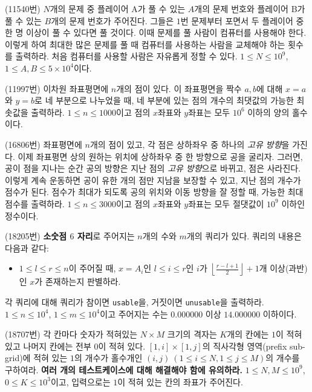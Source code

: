 \begin{problem}
    (11540번) $N$개의 문제 중 플레이어 A가 풀 수 있는 $A$개의 문제 번호와 플레이어 B가 풀 수 있는 $B$개의 문제 번호가 주어진다. 그들은 $1$번 문제부터 포면서 두 플레이어 중 한 명 이상이 풀 수 있다면 풀 것이다. 이때 문제를 풀 사람이 컴퓨터를 사용해야 한다. 이렇게 하여 최대한 많은 문제를 풀 때 컴퓨터를 사용하는 사람을 교체해야 하는 횟수를 출력하라. 처음 컴퓨터를 사용할 사람은 자유롭게 정할 수 있다. $1 \leq N \leq 10^9$, $1 \leq A, B \leq 5 \times 10^4$이다.
\end{problem}

\begin{problem}
    (11997번) 이차원 좌표평면에 $n$개의 점이 있다. 이 좌표평면을 짝수 $a, b$에 대해 $x=a$와 $y=b$로 네 부분으로 나누었을 때, 네 부분에 있는 점의 개수의 최댓값의 가능한 최솟값을 출력하라. $1 \leq n \leq 1000$이고 점의 $x$좌표와 $y$좌표는 모두 $10^6$ 이하의 양의 홀수이다.
\end{problem}

\begin{problem}
    (16806번) 좌표평면에 $n$개의 점이 있고, 각 점은 상하좌우 중 하나의 \textit{고유 방향}을 가진다. 이제 좌표평면 상의 원하는 위치에 상하좌우 중 한 방향으로 공을 굴리자. 그러면, 공이 점을 지나는 순간 공의 방향은 지난 점의 \textit{고유 방향}으로 바뀌고, 점은 사라진다. 이렇게 계속 운동하면 공이 유한 개의 점만 지남을 보장할 수 있고, 지난 점의 개수가 점수가 된다. 점수가 최대가 되도록 공의 위치와 이동 방향을 잘 정할 때, 가능한 최대 점수를 출력하라. $1 \leq n \leq 3000$이고 점의 $x$좌표와 $y$좌표는 모두 절댓값이 $10^9$ 이하인 정수이다.
\end{problem}

\begin{problem}
    (18205번) \textbf{소숫점 $6$ 자리}로 주어지는 $n$개의 수와 $m$개의 쿼리가 있다. 쿼리의 내용은 다음과 같다:
    \begin{itemize}
        \item $1 \leq l \leq r \leq n$이 주어질 때, $x = A_i$인 $l \leq i \leq r$인 $i$가 $\left\lfloor \frac{r-l+1}{2} \right\rfloor + 1$개 이상(과반)인 $x$가 존재하는지 판별하라.
    \end{itemize}
    각 쿼리에 대해 쿼리가 참이면 \texttt{usable}을, 거짓이면 \texttt{unusable}을 출력하라. $1 \leq n \leq 10^4$, $1 \leq m \leq 10^4$이고 주어지는 수는 $0.000000$ 이상 $14.000000$ 이하이다.
\end{problem}

\begin{problem}
    (18707번) 각 칸마다 숫자가 적혀있는 $N \times M$ 크기의 격자는 $K$개의 칸에는 $1$이 적혀있고 나머지 칸에는 전부 $0$이 적혀 있다. $[1, i] \times [1, j]$의 직사각형 영역(prefix sub-grid)에 적혀 있는 $1$의 개수가 홀수개인 $(i, j)~(1 \leq i \leq N, 1 \leq j \leq M)$의 개수를 구하여라. \textbf{여러 개의 테스트케이스에 대해 해결해야 함에 유의하라.} $1 \leq N, M \leq 10^9$, $0 \leq K \leq 10^3$이고, 입력으로는 $1$이 적혀 있는 칸의 좌표가 주어진다.
\end{problem}

